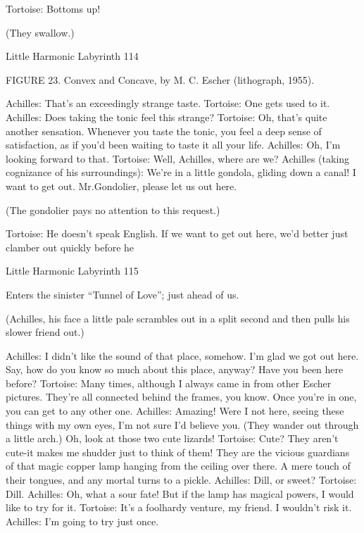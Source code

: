           Tortoise: Bottoms up!

          (They swallow.)




Little Harmonic Labyrinth                                                               114

              FIGURE 23. Convex and Concave, by M. C. Escher (lithograph, 1955).


          Achilles: That's an exceedingly strange taste.
          Tortoise: One gets used to it.
          Achilles: Does taking the tonic feel this strange? Tortoise: Oh, that's quite
                 another sensation. Whenever you taste the tonic, you feel a deep sense
                 of satisfaction, as if you'd been waiting to taste it all your life.
                 Achilles: Oh, I'm looking forward to that. Tortoise: Well, Achilles,
                 where are we?
          Achilles (taking cognizance of his surroundings): We're in a little gondola,
                 gliding down a canal! I want to get out. Mr.Gondolier, please let us
                 out here.

                  (The gondolier pays no attention to this request.)

          Tortoise: He doesn't speak English. If we want to get out here, we'd better just
                 clamber out quickly before he




Little Harmonic Labyrinth                                                             115

          Enters the sinister “Tunnel of Love”; just ahead of us.

             (Achilles, his face a little pale scrambles out in a split second and then
             pulls his slower friend out.)

          Achilles: I didn't like the sound of that place, somehow. I'm glad we got out
                 here. Say, how do you know so much about this place, anyway? Have
                 you been here before?
          Tortoise: Many times, although I always came in from other Escher pictures.
                 They're all connected behind the frames, you know. Once you're in
                 one, you can get to any other one.
          Achilles: Amazing! Were I not here, seeing these things with my own eyes,
                 I'm not sure I'd believe you. (They wander out through a little arch.)
                 Oh, look at those two cute lizards!
          Tortoise: Cute? They aren't cute-it makes me shudder just to think of them!
                 They are the vicious guardians of that magic copper lamp hanging
                 from the ceiling over there. A mere touch of their tongues, and any
                 mortal turns to a pickle.
          Achilles: Dill, or sweet?
          Tortoise: Dill.
          Achilles: Oh, what a sour fate! But if the lamp has magical powers, I would
                 like to try for it.
          Tortoise: It's a foolhardy venture, my friend. I wouldn't risk it.
          Achilles: I'm going to try just once.

